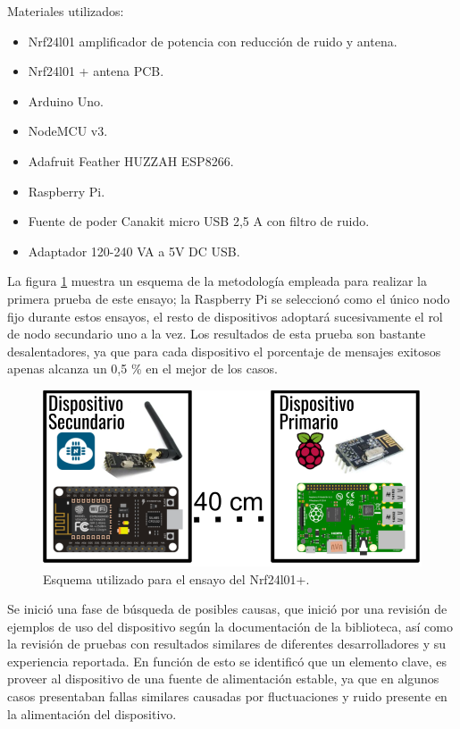 Materiales utilizados:
\begin{itemize}
\item  Nrf24l01 amplificador de potencia con reducción de ruido y antena.
\item  Nrf24l01 + antena PCB.
\item  Arduino Uno.   
\item  NodeMCU v3.
\item  Adafruit Feather HUZZAH ESP8266.
\item  Raspberry Pi.
\item  Fuente de poder Canakit micro USB 2,5 A con filtro de ruido.
\item Adaptador 120-240 VA a 5V DC USB.
\end{itemize}

La figura \ref{fig:figura_a} muestra un esquema de la metodología empleada para realizar la primera prueba de este ensayo; la Raspberry Pi se seleccionó como el único nodo fijo durante estos ensayos, el resto de dispositivos adoptará sucesivamente el rol de nodo secundario uno a la vez. Los resultados de esta prueba son bastante desalentadores, ya que para cada dispositivo el porcentaje de mensajes exitosos apenas alcanza un 0,5 \% en el mejor de los casos.


\begin{figure}[ht]
	\centering
	\includegraphics[scale=.45]{./Figures/Capitulo4/Figura_A.png}
	\caption{Esquema utilizado para el ensayo del Nrf24l01+.}
	\label{fig:figura_a}
\end{figure}


Se inició una fase de búsqueda de posibles causas, que inició por una revisión de ejemplos de uso del dispositivo según la documentación de la biblioteca, así como la revisión de pruebas con resultados similares de diferentes desarrolladores y su experiencia reportada. En función de esto se identificó que un elemento clave, es proveer al dispositivo de una fuente de alimentación estable, ya que en algunos casos presentaban fallas similares causadas por fluctuaciones y ruido presente en la alimentación del dispositivo.

